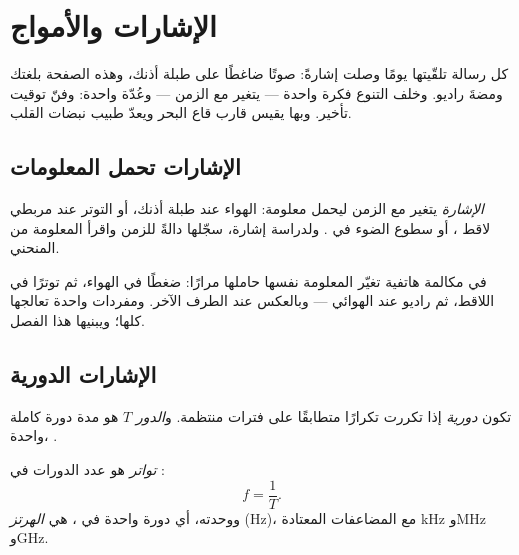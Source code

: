 \chapter{الإشارات والأمواج}\label{ch:g10:signals-and-waves}

كل رسالة تلقّيتها يومًا وصلت إشارةً: صوتًا ضاغطًا
على طبلة أذنك، وهذه الصفحة بلغتك ومضةَ راديو. وخلف
التنوع فكرة واحدة ---  يتغير مع الزمن --- وعُدّة
واحدة:    وفنّ توقيت تأخير.
وبها يقيس قارب قاع البحر ويعدّ طبيب نبضات القلب.

\section{الإشارات تحمل المعلومات}

\begin{definition}[الإشارة]\label{def:g10:signals-and-waves:signal}
\emph{الإشارة}  يتغير مع الزمن
ليحمل معلومة:  الهواء عند طبلة أذنك، أو التوتر عند
مربطي لاقط ، أو سطوع الضوء في .
ولدراسة إشارة، سجّلها دالةً للزمن واقرأ
المعلومة من المنحني.
\end{definition}

في مكالمة هاتفية تغيّر المعلومة نفسها حاملها مرارًا:
ضغطًا في الهواء، ثم توترًا في اللاقط، ثم راديو عند
الهوائي --- وبالعكس عند الطرف الآخر. ومفردات واحدة تعالجها
كلها؛ ويبنيها هذا الفصل.

\section{الإشارات الدورية}

\begin{definition}\label{def:g10:signals-and-waves:period}
تكون  \emph{دورية} إذا تكررت
تكرارًا متطابقًا على فترات منتظمة. و\emph{الدور} $T$ هو
مدة دورة كاملة واحدة، .
\end{definition}

\begin{definition}[التواتر]\label{def:g10:signals-and-waves:frequency}
\emph{تواتر}  هو عدد
الدورات في :
\[
f = \frac{1}{T} .
\]
ووحدته، أي دورة واحدة في ، هي \emph{الهرتز}
(\unit{Hz})، مع المضاعفات المعتادة \unit{kHz} و\unit{MHz} و\unit{GHz}.
\end{definition}

